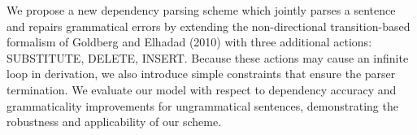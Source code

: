 We propose a new dependency parsing scheme which jointly parses a sentence and repairs grammatical errors by extending the non-directional transition-based formalism of Goldberg and Elhadad (2010) with three additional actions: SUBSTITUTE, DELETE, INSERT. Because these actions may cause an infinite loop in derivation, we also introduce simple constraints that ensure the parser termination. We evaluate our model with respect to dependency accuracy and grammaticality improvements for ungrammatical sentences, demonstrating the robustness and applicability of our scheme.
